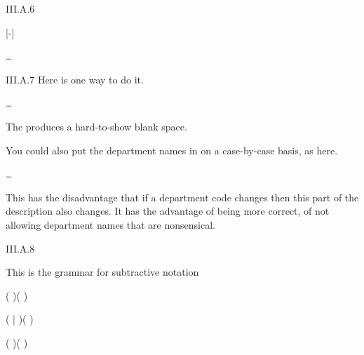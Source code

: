 %
\begin{ans}{III.A.6}
\begin{grammar}
 \bnfproduces{} [-]

 \bnfproduces{}  \syntaxor {} \ldots{} \syntaxor {}
\end{grammar}
\end{ans}
%
\begin{ans}{III.A.7}
Here is one way to do it.
\begin{grammar}
 \bnfproduces{}   

 \bnfproduces{}  \syntaxor {}

 \bnfproduces{} 

 \bnfproduces{} 

 \bnfproduces{} 

 \bnfproduces{}  \syntaxor \ldots{} 
\end{grammar}
The  produces a hard-to-show blank space.

You could also put the department names in on a case-by-case
basis, as here.
\begin{grammar}
 \bnfproduces{}  \syntaxor {} \syntaxor \ldots{}
\end{grammar}
This has the disadvantage that if a department code changes then this
part of the description also changes.
It has the advantage of being more correct, of not allowing department
names that are nonsensical.
\end{ans}
%
\begin{ans}{III.A.8}
\begin{exparts}
\item
\item This is the grammar for subtractive notation
\begin{grammar}
 \bnfproduces{}    

 \bnfproduces{}  \syntaxor {} \syntaxor {} \syntaxor {} \syntaxor \emptystring

 \bnfproduces{}  \syntaxor {} \syntaxor ( \syntaxor \emptystring)(\emptystring \syntaxor {} \syntaxor {} \syntaxor {} )

 \bnfproduces{}  \syntaxor {} \syntaxor ( | \emptystring )( \emptystring\syntaxor {} \syntaxor {} \syntaxor {})

 \bnfproduces{}  \syntaxor {} \syntaxor ( 
  \syntaxor \emptystring )( \emptystring \syntaxor {} \syntaxor {} \syntaxor {} )
\end{grammar}
\end{exparts}
\end{ans}

